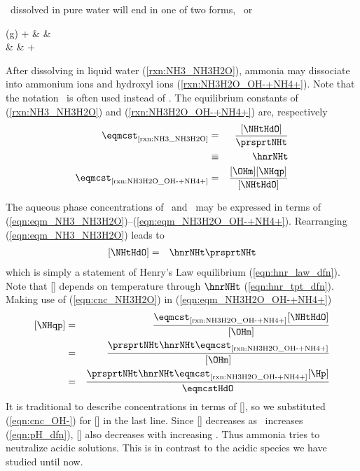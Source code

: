 \documentclass[12pt,twoside]{book}
\begin{document}
\NHt\ dissolved in pure water will end in one of two forms, \NHtHdO\
or \NHqp
\begin{rxnarray}
\label{rxn:NH3_NH3H2O}
\NHt (g) + \HdO & \eqbm & \NHtHdO \\ %
\label{rxn:NH3H2O_OH-+NH4+}
\NHtHdO & \eqbm & \OHm + \NHqp %
\end{rxnarray}
After dissolving in liquid water (\ref{rxn:NH3_NH3H2O}), ammonia
may dissociate into ammonium ions and hydroxyl ions
(\ref{rxn:NH3H2O_OH-+NH4+}). 
Note that the notation \NHqOH\ is often used instead of \NHtHdO.
The equilibrium constants of (\ref{rxn:NH3_NH3H2O}) and
(\ref{rxn:NH3H2O_OH-+NH4+}) are, respectively
\begin{eqnarray}
\label{eqn:eqm_NH3_NH3H2O}
\eqmcst_{\mbox{\scriptsize \ref{rxn:NH3_NH3H2O}}} & = & \frac{[\NHtHdO]}{\prsprtNHt } \\ %
& \equiv & \hnrNHt \nonumber \\
\label{eqn:eqm_NH3H2O_OH-+NH4+}
\eqmcst_{\mbox{\scriptsize \ref{rxn:NH3H2O_OH-+NH4+}}} & = & \frac{[\OHm] [\NHqp]}{[\NHtHdO] } %
\end{eqnarray}

The aqueous phase concentrations of \NHtHdO\ and \NHqp\ may be
expressed in terms of
(\ref{eqn:eqm_NH3_NH3H2O})--(\ref{eqn:eqm_NH3H2O_OH-+NH4+}). 
Rearranging (\ref{eqn:eqm_NH3_NH3H2O}) leads to
\begin{eqnarray}
\label{eqn:cnc_NH3H2O}
[\NHtHdO] & = & \hnrNHt \prsprtNHt %
\end{eqnarray}
which is simply a statement of Henry's Law equilibrium
(\ref{eqn:hnr_law_dfn}). 
Note that [\NHtHdO] depends on temperature through $\hnrNHt$ 
(\ref{eqn:hnr_tpt_dfn}). 
Making use of (\ref{eqn:cnc_NH3H2O}) in (\ref{eqn:eqm_NH3H2O_OH-+NH4+})
\begin{eqnarray}
\label{eqn:cnc_NH4+}
[\NHqp] & = & \frac{\eqmcst_{\mbox{\scriptsize \ref{rxn:NH3H2O_OH-+NH4+}}} [\NHtHdO]}{[\OHm] } \nonumber \\  %
& = & \frac{\prsprtNHt \hnrNHt \eqmcst_{\mbox{\scriptsize \ref{rxn:NH3H2O_OH-+NH4+}}}}{[\OHm] } \nonumber \\
& = & \frac{\prsprtNHt \hnrNHt \eqmcst_{\mbox{\scriptsize \ref{rxn:NH3H2O_OH-+NH4+}}} [\Hp]}{\eqmcstHdO } %
\end{eqnarray}
It is traditional to describe concentrations in terms of [\Hp], so 
we substituted (\ref{eqn:cnc_OH-}) for [\OHm] in the last line.
Since [\Hp] decreases as \pH\ increases (\ref{eqn:pH_dfn}), [\NHqp]  
also decreases with increasing \pH\@.
Thus ammonia tries to neutralize acidic solutions.
This is in contrast to the acidic species we have studied until now.
\end{document}
